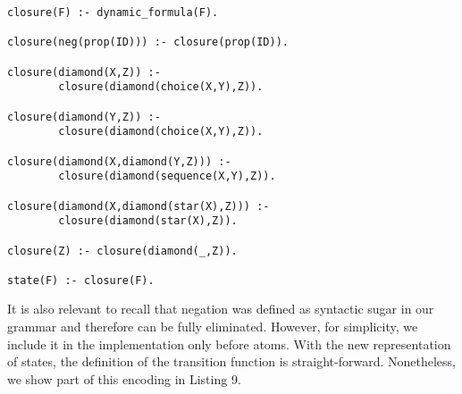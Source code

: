 \begin{center}
    \begin{lstlisting}[] 
closure(F) :- dynamic_formula(F).

closure(neg(prop(ID))) :- closure(prop(ID)).

closure(diamond(X,Z)) :- 
        closure(diamond(choice(X,Y),Z)).

closure(diamond(Y,Z)) :- 
        closure(diamond(choice(X,Y),Z)).

closure(diamond(X,diamond(Y,Z))) :- 
        closure(diamond(sequence(X,Y),Z)).

closure(diamond(X,diamond(star(X),Z))) :- 
        closure(diamond(star(X),Z)).

closure(Z) :- closure(diamond(_,Z)).

state(F) :- closure(F).
\end{lstlisting}
\end{center}





It is also relevant to recall that negation was defined as syntactic sugar in our grammar and therefore can be fully eliminated. 
However, for simplicity, we include it in the implementation only before atoms. With the new representation of states, the definition of the transition function is straight-forward. Nonetheless, we show part of this encoding in Listing 9.


